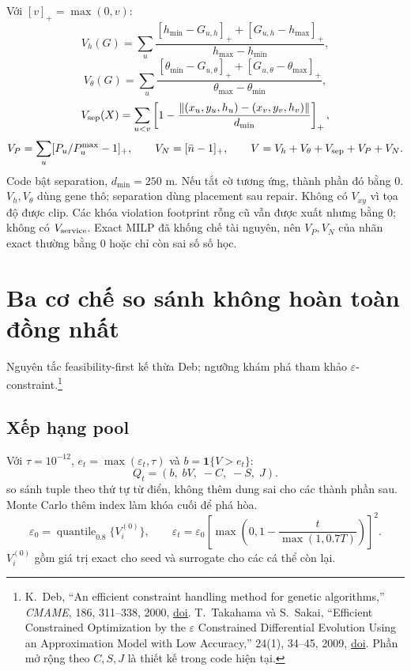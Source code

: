\documentclass[11pt,a4paper]{article}
\newcommand{\ind}{\mathbf1}
\newcommand{\norm}[1]{\left\lVert#1\right\rVert}
\newcommand{\qnt}{\operatorname{quantile}}
\newcommand{\code}[1]{\texttt{\detokenize{#1}}}
\begin{document}
Với $[v]_+=\max(0,v)$:
\[
V_h(G)=\sum_u\frac{[h_{\min}-G_{u,h}]_++[G_{u,h}-h_{\max}]_+}{h_{\max}-h_{\min}},
\]
\[
V_\theta(G)=\sum_u\frac{[\theta_{\min}-G_{u,\theta}]_++[G_{u,\theta}-\theta_{\max}]_+}{\theta_{\max}-\theta_{\min}},
\]
\[
V_{\rm sep}(X)=\sum_{u<v}\left[1-\frac{\norm{(x_u,y_u,h_u)-(x_v,y_v,h_v)}}{d_{\min}}\right]_+,
\]
\[
V_P=\sum_u[P_u/P_u^{\max}-1]_+,\qquad
V_N=[\bar n-1]_+,\qquad V=V_h+V_\theta+V_{\rm sep}+V_P+V_N.
\]
Code bật separation, $d_{\min}=250$ m. Nếu tắt cờ tương ứng, thành phần đó bằng $0$.
$V_h,V_\theta$ dùng gene thô; separation dùng placement sau repair. Không có $V_{xy}$ vì tọa độ được clip.
Các khóa violation footprint rỗng cũ vẫn được xuất nhưng bằng $0$; không có $V_{\rm service}$.
Exact MILP đã khống chế tài nguyên, nên $V_P,V_N$ của nhãn exact thường bằng $0$ hoặc chỉ còn sai số số học.

\section{Ba cơ chế so sánh không hoàn toàn đồng nhất}
Nguyên tắc feasibility-first kế thừa Deb; ngưỡng khám phá tham khảo $\varepsilon$-constraint.\footnote{K.~Deb, ``An efficient constraint handling method for genetic algorithms,'' \emph{CMAME}, 186, 311--338, 2000, \href{https://doi.org/10.1016/S0045-7825(99)00389-8}{doi}. T.~Takahama và S.~Sakai, ``Efficient Constrained Optimization by the $\varepsilon$ Constrained Differential Evolution Using an Approximation Model with Low Accuracy,'' 24(1), 34--45, 2009, \href{https://doi.org/10.1527/tjsai.24.34}{doi}. Phần mở rộng theo $C,S,J$ là thiết kế trong code hiện tại.}

\subsection{Xếp hạng pool}
Với $\tau=10^{-12}$, $e_t=\max(\varepsilon_t,\tau)$ và $b=\ind\{V>e_t\}$:
\[
Q_t=(b,\;bV,\;-C,\;-S,\;J).
\]
\code{_joint_quality()} so sánh tuple theo thứ tự từ điển, không thêm dung sai cho các thành phần sau. Monte Carlo thêm index làm khóa cuối để phá hòa.
\[
\varepsilon_0=\qnt_{0.8}\{V_i^{(0)}\},\qquad
\varepsilon_t=\varepsilon_0\left[\max\left(0,1-\frac{t}{\max(1,0.7T)}\right)\right]^2.
\]
$V_i^{(0)}$ gồm giá trị exact cho seed và surrogate cho các cá thể còn lại.
\end{document}
